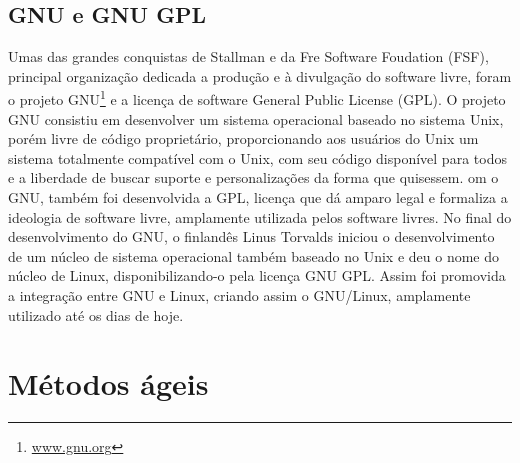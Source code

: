 \subsection{GNU e GNU GPL}

Umas das grandes conquistas de Stallman e da Fre Software Foudation (FSF), 
principal organização dedicada a produção e à divulgação do software livre, 
foram o projeto GNU\footnote{\url{www.gnu.org}} e a licença de software General Public License (GPL).
%
O projeto GNU consistiu em desenvolver um sistema operacional baseado no sistema 
Unix, porém livre de código proprietário, proporcionando aos usuários do Unix um 
sistema totalmente compatível com o Unix, com seu código disponível para todos e 
a liberdade de buscar suporte e personalizações da forma que quisessem.
%
om o GNU, também foi desenvolvida a GPL, licença que dá amparo legal e formaliza 
a ideologia de software livre, amplamente utilizada pelos software livres.
%
No final do desenvolvimento do GNU, o finlandês Linus Torvalds iniciou o 
desenvolvimento de um núcleo de sistema operacional também baseado no Unix e 
deu o nome do núcleo de Linux, disponibilizando-o pela licença GNU GPL. Assim 
foi promovida a integração entre GNU e Linux, criando assim o GNU/Linux, amplamente 
utilizado até os dias de hoje.


\section{Métodos ágeis}
\label{metodos-ageis}

